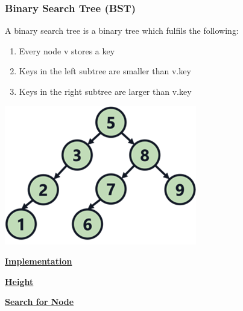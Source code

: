     \subsubsection{Binary Search Tree (BST)}
        \begin{minipage}{0.49\linewidth}
            A binary search tree is a binary tree which fulfils the following:
            \begin{enumerate}
                \item Every node v stores a key
                \item Keys in the left subtree are smaller than v.key
                \item Keys in the right subtree are larger than v.key
            \end{enumerate}
        \end{minipage}
        \begin{minipage}{0.49\linewidth}
            \includegraphics[width = \linewidth]{src/5_data_structure/images/bst.png}
        \end{minipage}

        {\centering\underline{\textbf{Implementation}} \par}
            

        {\centering\underline{\textbf{Height}} \par}
            

        {\centering\underline{\textbf{Search for Node}} \par}
            

